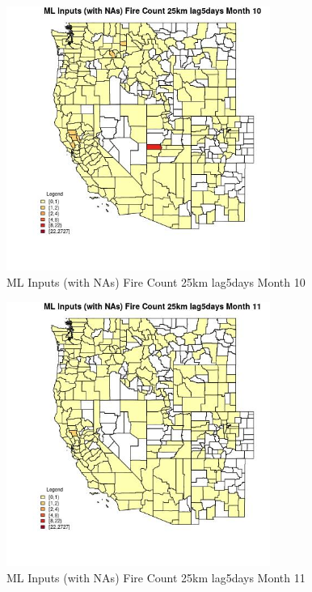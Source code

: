 \begin{figure} 
\centering  
\includegraphics[width=0.77\textwidth]{Code_Outputs/Report_ML_input_PM25_Step4_part_f_de_duplicated_aveswNAs_CountyFire_Count_25km_lag5daysmedianMonth10.jpg} 
\caption{\label{fig:Report_ML_input_PM25_Step4_part_f_de_duplicated_aveswNAsCountyFire_Count_25km_lag5daysmedianMonth10}ML Inputs (with NAs) Fire Count 25km lag5days Month 10} 
\end{figure} 
 

\clearpage 

\begin{figure} 
\centering  
\includegraphics[width=0.77\textwidth]{Code_Outputs/Report_ML_input_PM25_Step4_part_f_de_duplicated_aveswNAs_CountyFire_Count_25km_lag5daysmedianMonth11.jpg} 
\caption{\label{fig:Report_ML_input_PM25_Step4_part_f_de_duplicated_aveswNAsCountyFire_Count_25km_lag5daysmedianMonth11}ML Inputs (with NAs) Fire Count 25km lag5days Month 11} 
\end{figure} 
 

